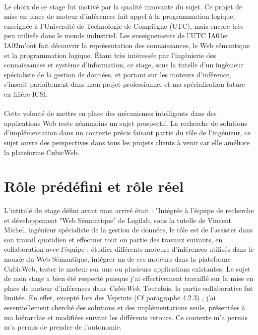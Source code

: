 \documentclass {report}
\begin{document}
\paragraph{}
Le choix de ce stage fut motivé par la qualité innovante du sujet. Ce projet de mise en place de moteur d'inférences fait appel à la programmation logique, enseignée à l'Université de Technologie de Compiègne (UTC), mais encore très peu utilisée dans le monde industriel. Les enseignements de l'UTC IA01\footnotemark[1] et IA02\footnotemark[2] m'ont fait découvrir la  représentation des connaissances, le Web sémantique et la programmation logique. Étant très intéressée par l'ingénierie des connaissances et système d'information, ce stage, sous la tutelle d'un ingénieur spécialiste de la gestion de données, et portant sur les moteurs d'inférence, s'inscrit parfaitement dans mon projet professionnel et ma spécialisation future en filière ICSI.
\paragraph{}
Cette volonté de mettre en place des mécanismes intelligents dans des applications Web reste néanmoins un sujet prospectif. La recherche de solutions d'implémentation dans un contexte précis faisant partie du rôle de l'ingénieur, ce sujet ouvre des perspectives dans tous les projets clients à venir car elle améliore la plateforme CubicWeb.


\section{Rôle prédéfini et rôle réel}
\paragraph{}
L'intitulé du stage défini avant mon arrivé était : "Intégrée à l'équipe de recherche et développement "Web Sémantique" de Logilab, sous la tutelle de Vincent Michel, ingénieur spécialiste de la gestion de données, le rôle est de l'assister dans son travail quotidien et effectuer tout ou partie des travaux suivants, en collaboration avec l'équipe : étudier différents moteurs d'inférences utilisés dans le monde du Web Sémantique, intégrer un de ces moteurs dans la plateforme CubicWeb, tester le moteur sur une ou plusieurs applications existantes. Le sujet de mon stage a bien été respecté puisque j'ai effectivement travaillé sur la mise en place de moteur d'inférences dans \textit{CubicWeb}. Toutefois, la partie collaborative fut limitée. En effet, excepté lors des Vsprints (Cf paragraphe 4.2.3) , j'ai essentiellement cherché des solutions et des implémentations seule, présentées à ma hiérarchie et modifiées suivant les différents retours. Ce contexte m'a permis m'a permis de prendre de l'autonomie.
\end{document}
